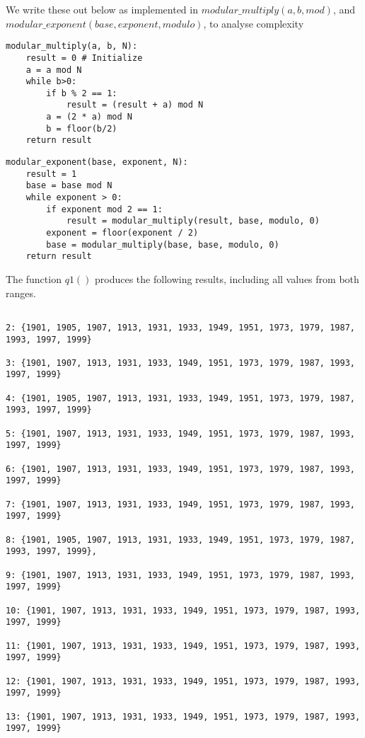 \documentclass[10pt,a4paper]{report}
\begin{document}
We write these out below as implemented in $modular\_multiply(a,b,mod)$, and \\ $modular\_exponent(base,exponent,modulo)$, to analyse complexity

\begin{verbatim}
modular_multiply(a, b, N):
    result = 0 # Initialize
    a = a mod N
    while b>0:
        if b % 2 == 1:
            result = (result + a) mod N
        a = (2 * a) mod N
        b = floor(b/2)
    return result

\end{verbatim}

\begin{verbatim}
modular_exponent(base, exponent, N):
    result = 1
    base = base mod N
    while exponent > 0:
        if exponent mod 2 == 1:
            result = modular_multiply(result, base, modulo, 0)
        exponent = floor(exponent / 2)
        base = modular_multiply(base, base, modulo, 0)
    return result
\end{verbatim}    

The function $q1()$ produces the following results, including all values from both ranges.

\begin{lstlisting}[breaklines]

2: {1901, 1905, 1907, 1913, 1931, 1933, 1949, 1951, 1973, 1979, 1987, 1993, 1997, 1999}

3: {1901, 1907, 1913, 1931, 1933, 1949, 1951, 1973, 1979, 1987, 1993, 1997, 1999}

4: {1901, 1905, 1907, 1913, 1931, 1933, 1949, 1951, 1973, 1979, 1987, 1993, 1997, 1999}

5: {1901, 1907, 1913, 1931, 1933, 1949, 1951, 1973, 1979, 1987, 1993, 1997, 1999}

6: {1901, 1907, 1913, 1931, 1933, 1949, 1951, 1973, 1979, 1987, 1993, 1997, 1999}

7: {1901, 1907, 1913, 1931, 1933, 1949, 1951, 1973, 1979, 1987, 1993, 1997, 1999}
 
8: {1901, 1905, 1907, 1913, 1931, 1933, 1949, 1951, 1973, 1979, 1987, 1993, 1997, 1999}, 
 
9: {1901, 1907, 1913, 1931, 1933, 1949, 1951, 1973, 1979, 1987, 1993, 1997, 1999}
 
10: {1901, 1907, 1913, 1931, 1933, 1949, 1951, 1973, 1979, 1987, 1993, 1997, 1999}
 
11: {1901, 1907, 1913, 1931, 1933, 1949, 1951, 1973, 1979, 1987, 1993, 1997, 1999}
 
12: {1901, 1907, 1913, 1931, 1933, 1949, 1951, 1973, 1979, 1987, 1993, 1997, 1999}
 
13: {1901, 1907, 1913, 1931, 1933, 1949, 1951, 1973, 1979, 1987, 1993, 1997, 1999}
 
\end{lstlisting}
\end{document}
